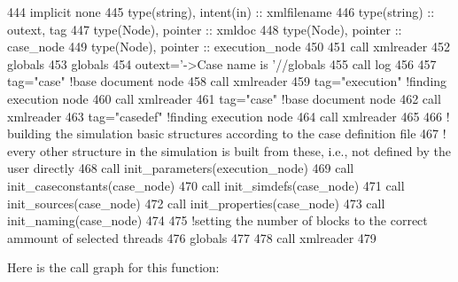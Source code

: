 \begin{DoxyCode}
444     \textcolor{keywordtype}{implicit none}
445     \textcolor{keywordtype}{type}(string), \textcolor{keywordtype}{intent(in)} :: xmlfilename
446     \textcolor{keywordtype}{type}(string) :: outext, tag
447     \textcolor{keywordtype}{type}(Node), \textcolor{keywordtype}{pointer} :: xmldoc
448     \textcolor{keywordtype}{type}(Node), \textcolor{keywordtype}{pointer} :: case\_node
449     \textcolor{keywordtype}{type}(Node), \textcolor{keywordtype}{pointer} :: execution\_node
450 
451     \textcolor{keyword}{call }xmlreader%
452     globals%
453     globals%
454     outext=\textcolor{stringliteral}{'->Case name is '}//globals%
455     \textcolor{keyword}{call }log%
456 
457     tag=\textcolor{stringliteral}{"case"}          \textcolor{comment}{!base document node}
458     \textcolor{keyword}{call }xmlreader%
459     tag=\textcolor{stringliteral}{"execution"}     \textcolor{comment}{!finding execution node}
460     \textcolor{keyword}{call }xmlreader%
461     tag=\textcolor{stringliteral}{"case"}          \textcolor{comment}{!base document node}
462     \textcolor{keyword}{call }xmlreader%
463     tag=\textcolor{stringliteral}{"casedef"}     \textcolor{comment}{!finding execution node}
464     \textcolor{keyword}{call }xmlreader%
465 
466     \textcolor{comment}{! building the simulation basic structures according to the case definition file}
467     \textcolor{comment}{! every other structure in the simulation is built from these, i.e., not defined by the user directly}
468     \textcolor{keyword}{call }init\_parameters(execution\_node)
469     \textcolor{keyword}{call }init\_caseconstants(case\_node)
470     \textcolor{keyword}{call }init\_simdefs(case\_node)
471     \textcolor{keyword}{call }init\_sources(case\_node)
472     \textcolor{keyword}{call }init\_properties(case\_node)
473     \textcolor{keyword}{call }init\_naming(case\_node)
474 
475     \textcolor{comment}{!setting the number of blocks to the correct ammount of selected threads}
476     globals%
477 
478     \textcolor{keyword}{call }xmlreader%
479 
\end{DoxyCode}
Here is the call graph for this function\+:\nopagebreak
